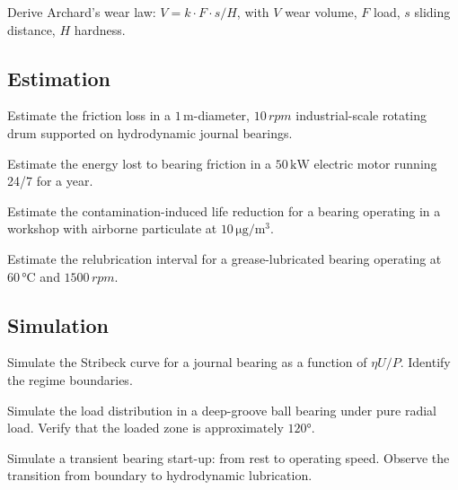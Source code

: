 \begin{exercise}
Derive Archard's wear law: $V = k \cdot F \cdot s / H$, with $V$ wear volume, $F$ load, $s$ sliding distance, $H$ hardness.
\end{exercise}

\subsection*{Estimation}

\begin{exercise}
Estimate the friction loss in a $1\,\si{\meter}$-diameter, $10\,\si{rpm}$ industrial-scale rotating drum supported on hydrodynamic journal bearings.
\end{exercise}

\begin{exercise}
Estimate the energy lost to bearing friction in a $50\,\si{\kilo\watt}$ electric motor running 24/7 for a year.
\end{exercise}

\begin{exercise}
Estimate the contamination-induced life reduction for a bearing operating in a workshop with airborne particulate at $10\,\si{\micro\gram\per\meter\cubed}$.
\end{exercise}

\begin{exercise}
Estimate the relubrication interval for a grease-lubricated bearing operating at $60\,\si{\degreeCelsius}$ and $1500\,\si{rpm}$.
\end{exercise}

\subsection*{Simulation}

\begin{exercise}
Simulate the Stribeck curve for a journal bearing as a function of $\eta U / P$. Identify the regime boundaries.
\end{exercise}

\begin{exercise}
Simulate the load distribution in a deep-groove ball bearing under pure radial load. Verify that the loaded zone is approximately $120°$.
\end{exercise}

\begin{exercise}
Simulate a transient bearing start-up: from rest to operating speed. Observe the transition from boundary to hydrodynamic lubrication.
\end{exercise}

